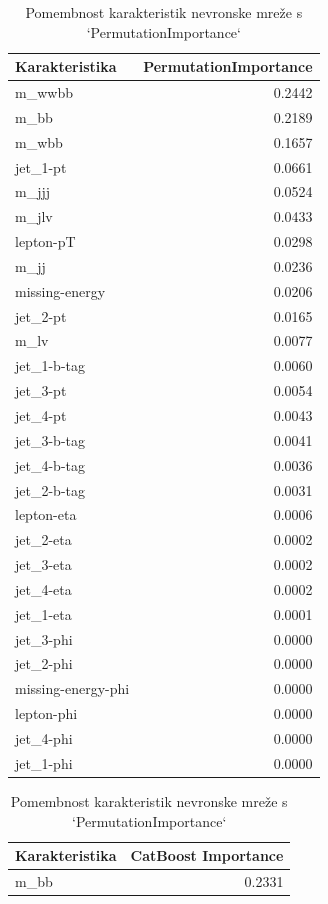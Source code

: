 \documentclass{article}
\begin{document}
\begin{table}[H]
\centering
\begin{minipage}{0.48\textwidth}
\centering
\begin{tabular}{l r}
\hline
\textbf{Karakteristika} & \textbf{PermutationImportance} \\
\hline
m\_wwbb & 0.2442 \\
m\_bb & 0.2189 \\
m\_wbb & 0.1657 \\
jet\_1-pt & 0.0661 \\
m\_jjj & 0.0524 \\
m\_jlv & 0.0433 \\
lepton-pT & 0.0298 \\
m\_jj & 0.0236 \\
missing-energy & 0.0206 \\
jet\_2-pt & 0.0165 \\
m\_lv & 0.0077 \\
jet\_1-b-tag & 0.0060 \\
jet\_3-pt & 0.0054 \\
jet\_4-pt & 0.0043 \\
jet\_3-b-tag & 0.0041 \\
jet\_4-b-tag & 0.0036 \\
jet\_2-b-tag & 0.0031 \\
lepton-eta & 0.0006 \\
jet\_2-eta & 0.0002 \\
jet\_3-eta & 0.0002 \\
jet\_4-eta & 0.0002 \\
jet\_1-eta & 0.0001 \\
jet\_3-phi & 0.0000 \\
jet\_2-phi & 0.0000 \\
missing-energy-phi & 0.0000 \\
lepton-phi & 0.0000 \\
jet\_4-phi & 0.0000 \\
jet\_1-phi & 0.0000 \\
\hline
\end{tabular}
\caption{Pomembnost karakteristik nevronske mreže s `PermutationImportance`}
\label{tab:nnimportance}
\end{minipage}
\hfill
\begin{minipage}{0.48\textwidth}
\centering
\begin{tabular}{l r}
\hline
\textbf{Karakteristika} & \textbf{CatBoost Importance} \\
\hline
m\_bb & 0.2331 \\

\end{tabular}
\end{minipage}
\end{table}
\end{document}
